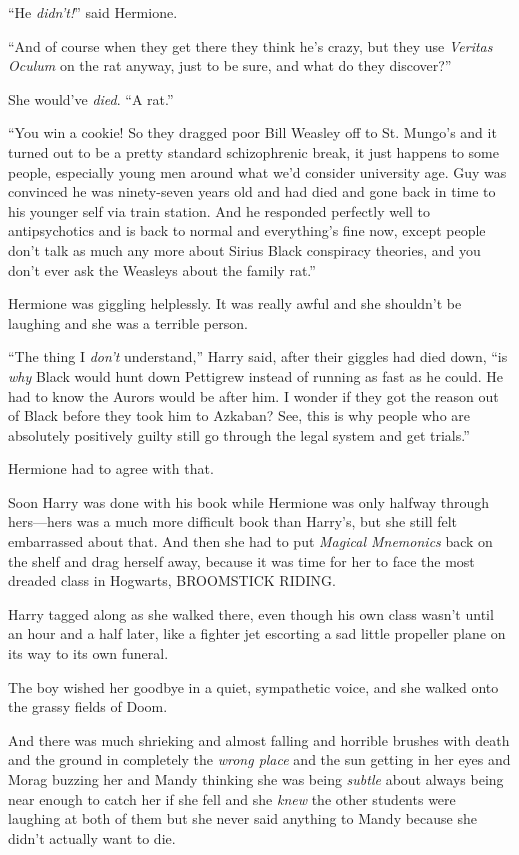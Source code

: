 “He \emph{didn’t!}” said Hermione.

“And of course when they get there they think he’s crazy, but they use \emph{Veritas Oculum} on the rat anyway, just to be sure, and what do they discover?”

She would’ve \emph{died}. “A rat.”

“You win a cookie! So they dragged poor Bill Weasley off to St. Mungo’s and it turned out to be a pretty standard schizophrenic break, it just happens to some people, especially young men around what we’d consider university age. Guy was convinced he was ninety-seven years old and had died and gone back in time to his younger self via train station. And he responded perfectly well to antipsychotics and is back to normal and everything’s fine now, except people don’t talk as much any more about Sirius Black conspiracy theories, and you don’t ever ask the Weasleys about the family rat.”

Hermione was giggling helplessly. It was really awful and she shouldn’t be laughing and she was a terrible person.

“The thing I \emph{don’t} understand,” Harry said, after their giggles had died down, “is \emph{why} Black would hunt down Pettigrew instead of running as fast as he could. He had to know the Aurors would be after him. I wonder if they got the reason out of Black before they took him to Azkaban? See, this is why people who are absolutely positively guilty still go through the legal system and get trials.”

Hermione had to agree with that.

Soon Harry was done with his book while Hermione was only halfway through hers—hers was a much more difficult book than Harry’s, but she still felt embarrassed about that. And then she had to put \emph{Magical Mnemonics} back on the shelf and drag herself away, because it was time for her to face the most dreaded class in Hogwarts, BROOMSTICK RIDING.

Harry tagged along as she walked there, even though his own class wasn’t until an hour and a half later, like a fighter jet escorting a sad little propeller plane on its way to its own funeral.

The boy wished her goodbye in a quiet, sympathetic voice, and she walked onto the grassy fields of Doom.

And there was much shrieking and almost falling and horrible brushes with death and the ground in completely the \emph{wrong place} and the sun getting in her eyes and Morag buzzing her and Mandy thinking she was being \emph{subtle} about always being near enough to catch her if she fell and she \emph{knew} the other students were laughing at both of them but she never said anything to Mandy because she didn’t actually want to die.

